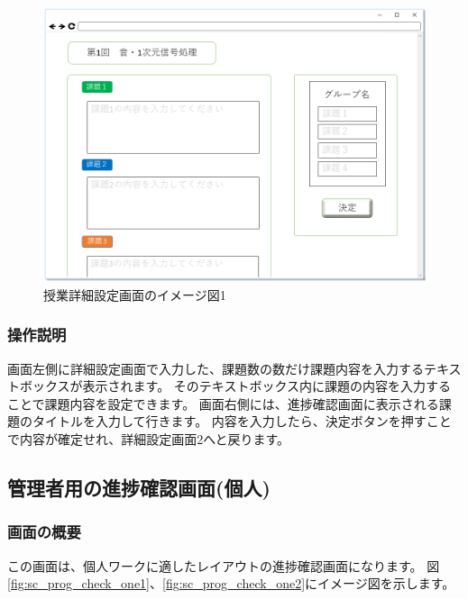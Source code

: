 \begin{figure}[htbp]
\begin{center}
  \includegraphics[width=1\linewidth,clip]{./img/sc_class_detail3.png}
  \caption{授業詳細設定画面のイメージ図1}\label{fig:sc_class_detail3}
\end{center}
\end{figure}

\subsubsection{操作説明}
画面左側に詳細設定画面で入力した、課題数の数だけ課題内容を入力するテキストボックスが表示されます。
そのテキストボックス内に課題の内容を入力することで課題内容を設定できます。
画面右側には、進捗確認画面に表示される課題のタイトルを入力して行きます。
内容を入力したら、決定ボタンを押すことで内容が確定せれ、詳細設定画面2へと戻ります。

\newpage

\subsection{管理者用の進捗確認画面(個人)}
\subsubsection{画面の概要}
この画面は、個人ワークに適したレイアウトの進捗確認画面になります。
図\ref{fig:sc_prog_check_one1}、\ref{fig:sc_prog_check_one2}にイメージ図を示します。


